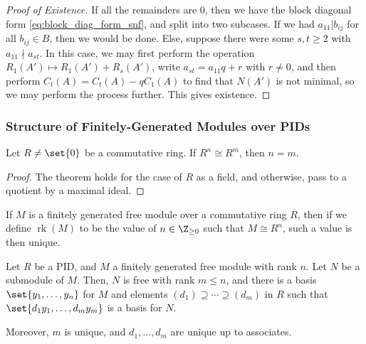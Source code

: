 \documentclass[10pt]{mypackage}
\begin{document}
\begin{proof}[Proof of Existence]
  If all the remainders are $0$, then we have the block diagonal form \eqref{eq:block_diag_form_snf}, and split into two subcases. If we had $a_{11} | b_{ij}$ for all $b_{ij}\in B$, then we would be done. Else, suppose there were some $s,t \geq 2$ with $a_{11}\nmid a_{st}$. In this case, we may first perform the operation $R_1(A')\mapsto R_1(A') + R_s(A')$, write $a_{st} = a_{11}q + r$ with $r\neq 0$, and then perform $C_t(A) = C_t(A) - qC_1(A)$ to find that $N(A')$ is not minimal, so we may perform the process further. This gives existence.
\end{proof}
\subsubsection{Structure of Finitely-Generated Modules over PIDs}%
\begin{theorem}
  Let $R\neq \set{0}$ be a commutative ring. If $R^{n}\cong R^{m}$, then $n = m$.
\end{theorem}
\begin{proof}
  The theorem holds for the case of $R$ as a field, and otherwise, pass to a quotient by a maximal ideal.
\end{proof}
\begin{corollary}
  If $M$ is a finitely generated free module over a commutative ring $R$, then if we define $\operatorname{rk}(M)$ to be the value of $n\in \Z_{\geq 0}$ such that $M \cong R^{n}$, such a value is then unique.
\end{corollary}
\begin{theorem}
  Let $R$ be a PID, and $M$ a finitely generated free module with rank $n$. Let $N$ be a submodule of $M$. Then, $N$ is free with rank $m\leq n$, and there is a basis $\set{y_1,\dots,y_n}$ for $M$ and elements $\left( d_1 \right)\supseteq\cdots\supseteq \left( d_m \right)$ in $R$ such that $\set{d_1y_1,\dots,d_my_m}$ is a basis for $N$.

  Moreover, $m$ is unique, and $d_1,\dots,d_m$ are unique up to associates.
\end{theorem}
\end{document}
